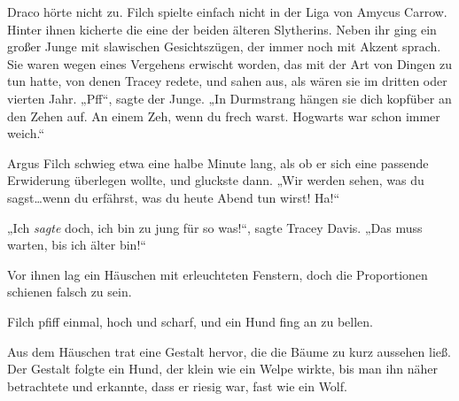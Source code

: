Draco hörte nicht zu. Filch spielte einfach nicht in der Liga von Amycus Carrow.
Hinter ihnen kicherte die eine der beiden älteren Slytherins. Neben ihr ging ein großer Junge mit slawischen Gesichtszügen, der immer noch mit Akzent sprach. Sie waren wegen eines Vergehens erwischt worden, das mit der Art von Dingen zu tun hatte, von denen Tracey redete, und sahen aus, als wären sie im dritten oder vierten Jahr.
„Pff“, sagte der Junge. „In Durmstrang hängen sie dich kopfüber an den Zehen auf. An einem Zeh, wenn du frech warst. Hogwarts war schon immer weich.“

Argus Filch schwieg etwa eine halbe Minute lang, als ob er sich eine passende Erwiderung überlegen wollte, und gluckste dann. „Wir werden sehen, was du sagst…wenn du erfährst, was du heute Abend tun wirst! Ha!“

„Ich \emph{sagte} doch, ich bin zu jung für so was!“, sagte Tracey Davis. „Das muss warten, bis ich älter bin!“

Vor ihnen lag ein Häuschen mit erleuchteten Fenstern, doch die Proportionen schienen falsch zu sein.

Filch pfiff einmal, hoch und scharf, und ein Hund fing an zu bellen.

Aus dem Häuschen trat eine Gestalt hervor, die die Bäume zu kurz aussehen ließ. Der Gestalt folgte ein Hund, der klein wie ein Welpe wirkte, bis man ihn näher betrachtete und erkannte, dass er riesig war, fast wie ein Wolf.

